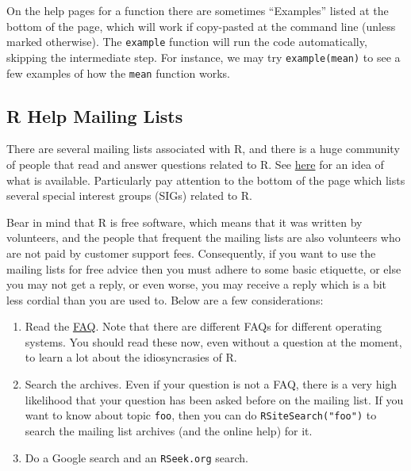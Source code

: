 \documentclass[]{book}
\providecommand{\tightlist}{%
  \setlength{\itemsep}{0pt}\setlength{\parskip}{0pt}}
\numberwithin{equation}{chapter}
\numberwithin{figure}{chapter}
\theoremstyle{plain}
\theoremstyle{definition}
\theoremstyle{remark}
\theoremstyle{definition}
\theoremstyle{definition}
\theoremstyle{remark}
\begin{document}
On the help pages for a function there are sometimes ``Examples'' listed
at the bottom of the page, which will work if copy-pasted at the command
line (unless marked otherwise). The \texttt{example}
 function will run the code
automatically, skipping the intermediate step. For instance, we may try
\texttt{example(mean)} to see a few examples of how the \texttt{mean}
function works.

\subsection{R Help Mailing Lists}\label{r-help-mailing-lists}

There are several mailing lists associated with R, and there is a huge
community of people that read and answer questions related to R. See
\href{http://www.r-project.org/mail.html}{here} for an idea of what is
available. Particularly pay attention to the bottom of the page which
lists several special interest groups (SIGs) related to R.

Bear in mind that R is free software, which means that it was written by
volunteers, and the people that frequent the mailing lists are also
volunteers who are not paid by customer support fees. Consequently, if
you want to use the mailing lists for free advice then you must adhere
to some basic etiquette, or else you may not get a reply, or even worse,
you may receive a reply which is a bit less cordial than you are used
to. Below are a few considerations:

\begin{enumerate}
\def\labelenumi{\arabic{enumi}.}
\tightlist
\item
  Read the \href{http://cran.r-project.org/faqs.html}{FAQ}. Note that
  there are different FAQs for different operating systems. You should
  read these now, even without a question at the moment, to learn a lot
  about the idiosyncrasies of R.
\item
  Search the archives. Even if your question is not a FAQ, there is a
  very high likelihood that your question has been asked before on the
  mailing list. If you want to know about topic \texttt{foo}, then you
  can do \texttt{RSiteSearch("foo")}
   to search the mailing list
  archives (and the online help) for it.
\item
  Do a Google search and an \texttt{RSeek.org} search.
\end{enumerate}
\end{document}
